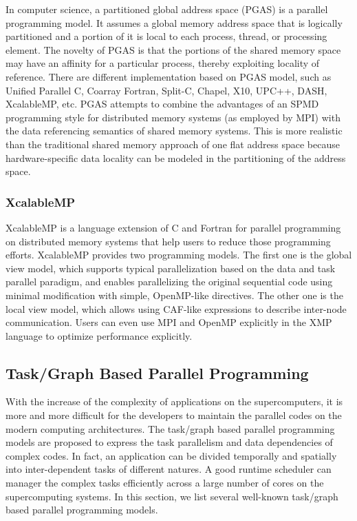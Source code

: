 In computer science, a partitioned global address space (PGAS) is a parallel programming model. It assumes a global memory address space that is logically partitioned and a portion of it is local to each process, thread, or processing element. The novelty of PGAS is that the portions of the shared memory space may have an affinity for a particular process, thereby exploiting locality of reference. There are different implementation based on PGAS model, such as Unified Parallel C, Coarray Fortran, Split-C, Chapel, X10, UPC++, DASH, XcalableMP, etc. PGAS attempts to combine the advantages of an SPMD programming style for distributed memory systems (as employed by MPI) with the data referencing semantics of shared memory systems. This is more realistic than the traditional shared memory approach of one flat address space because hardware-specific data locality can be modeled in the partitioning of the address space.

\subsubsection{XcalableMP}

XcalableMP \cite{lee2010implementation} is a language extension of C and Fortran for parallel programming on distributed memory systems that help users to reduce those programming efforts. XcalableMP provides two programming models. The first one is the global view model, which supports typical parallelization based on the data and task parallel paradigm, and enables parallelizing the original sequential code using minimal modification with simple, OpenMP-like directives. The other one is the local view model, which allows using CAF-like expressions to describe inter-node communication. Users can even use MPI and OpenMP explicitly in the XMP language to optimize performance explicitly.

\subsection{Task/Graph Based Parallel Programming}

With the increase of the complexity of applications on the supercomputers, it is more and more difficult for the developers to maintain the parallel codes on the modern computing architectures. The task/graph based parallel programming models are proposed to express the task parallelism and data dependencies of complex codes. In fact, an application can be divided temporally and spatially into inter-dependent tasks of different natures. A good runtime scheduler can manager the complex tasks efficiently across a large number of cores on the supercomputing systems. In this section, we list several well-known task/graph based parallel programming models.

